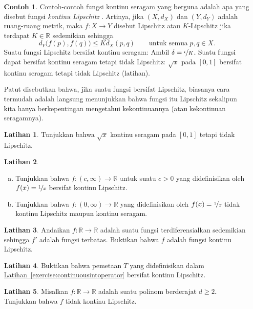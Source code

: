 \documentclass[12pt,openany]{book}
\newcommand{\R}{{\mathbb{R}}}
\theoremstyle{plain}
\theoremstyle{remark}
\theoremstyle{definition}
\newenvironment{exbox}{%
    \def\FrameCommand{\vrule width 1pt \relax\hspace{10pt}}%
    \MakeFramed{\advance\hsize-\width\FrameRestore}%
}{%
    \endMakeFramed
}
\newenvironment{exparts}{%
    \leavevmode\begin{enumerate}[a),noitemsep,topsep=0pt,parsep=0pt,partopsep=0pt]
}{%
    \end{enumerate}
}
\theoremstyle{exercise}
\newtheorem{exercise}{Latihan}[section]
\theoremstyle{example}
\newtheorem{example}[thm]{Contoh}
\newcommand{\exerciseref}[1]{\hyperref[#1]{Latihan~\ref*{#1}}}
\begin{document}
\begin{example}
Contoh-contoh fungsi kontinu seragam yang berguna adalah apa yang disebut
fungsi \emph{kontinu Lipschitz}%
%
.
Artinya, jika
$(X,d_X)$ dan $(Y,d_Y)$ adalah ruang-ruang metrik, maka $f \colon X \to Y$
disebut Lipschitz atau $K$-Lipschitz jika terdapat $K \in \R$ sedemikian sehingga
\begin{equation*}
d_Y\bigl(f(p),f(q)\bigr) \leq K d_X(p,q)
\qquad \text{untuk semua } p,q \in X.
\end{equation*}
Suatu fungsi Lipschitz bersifat kontinu seragam:
Ambil $\delta = \nicefrac{\epsilon}{K}$.
Suatu fungsi dapat bersifat kontinu seragam
tetapi tidak Lipschitz:
$\sqrt{x}$ pada $[0,1]$
bersifat kontinu seragam tetapi tidak Lipschitz (latihan).

Patut disebutkan bahwa,
jika suatu fungsi bersifat Lipschitz, biasanya
cara termudah adalah langsung menunjukkan bahwa fungsi itu Lipschitz sekalipun kita hanya
berkepentingan mengetahui kekontinuannya (atau kekontinuan seragamnya).
\end{example}

\begin{exbox}
\begin{exercise}
Tunjukkan bahwa $\sqrt{x}$ kontinu seragam pada $[0,1]$ tetapi tidak Lipschitz.
\end{exercise}

\begin{exercise}
\begin{exparts}
\item
Tunjukkan bahwa $f \colon (c,\infty) \to \R$ untuk suatu $c > 0$
yang didefinisikan oleh $f(x) = \nicefrac{1}{x}$ bersifat kontinu Lipschitz.
\item
Tunjukkan bahwa $f \colon (0,\infty) \to \R$
yang didefinisikan oleh $f(x) = \nicefrac{1}{x}$ tidak kontinu Lipschitz maupun
kontinu seragam.
\end{exparts}
\end{exercise}

\begin{exercise}
Andaikan $f \colon \R \to \R$ adalah suatu fungsi terdiferensialkan
sedemikian sehingga $f'$ adalah fungsi terbatas.  Buktikan bahwa
$f$ adalah fungsi kontinu Lipschitz.
\end{exercise}

\begin{exercise}
Buktikan bahwa pemetaan $T$ yang didefinisikan dalam \exerciseref{exercise:continuousintoperator}
bersifat kontinu Lipschitz.
\end{exercise}

\begin{exercise}
Misalkan $f \colon \R \to \R$ adalah suatu polinom berderajat 
$d \geq 2$.  Tunjukkan bahwa $f$ tidak kontinu
Lipschitz.
\end{exercise}
\end{exbox}
\end{document}

